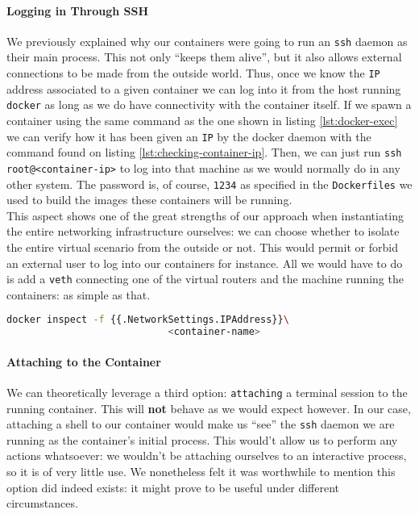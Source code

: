                 \paragraph{Logging in Through SSH}
                    We previously explained why our containers were going to run an \texttt{ssh} daemon as their main process. This not only ``keeps them alive'', but it also allows external connections to be made from the outside world. Thus, once we know the \texttt{IP} address associated to a given container we can log into it from the host running \texttt{docker} as long as we do have connectivity with the container itself. If we spawn a container using the same command as the one shown in listing \ref{lst:docker-exec} we can verify how it has been given an \texttt{IP} by the docker daemon with the command found on listing \ref{lst:checking-container-ip}. Then, we can just run \texttt{ssh root@<container-ip>} to log into that machine as we would normally do in any other system. The password is, of course, \texttt{1234} as specified in the \texttt{Dockerfiles} we used to build the images these containers will be running.\\

                    This aspect shows one of the great strengths of our approach when instantiating the entire networking infrastructure ourselves: we can choose whether to isolate the entire virtual scenario from the outside or not. This would permit or forbid an external user to log into our containers for instance. All we would have to do is add a \texttt{veth} connecting one of the virtual routers and the machine running the containers: as simple as that.\\

                    \begin{lstlisting}[language = bash, caption = Checking a container's \texttt{IP} address., label = lst: checking-container-ip]
                        docker inspect -f {{.NetworkSettings.IPAddress}}\
                            <container-name>
                    \end{lstlisting}

                \paragraph{Attaching to the Container}
                    We can theoretically leverage a third option: \texttt{attaching} a terminal session to the running container. This will \textbf{not} behave as we would expect however. In our case, attaching a shell to our container would make us ``see'' the \texttt{ssh} daemon we are running as the container's initial process. This would't allow us to perform any actions whatsoever: we wouldn't be attaching ourselves to an interactive process, so it is of very little use. We nonetheless felt it was worthwhile to mention this option did indeed exists: it might prove to be useful under different circumstances.\\

